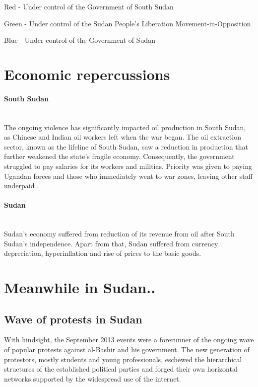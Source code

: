 \documentclass[14pt,a4paper]{article}
\begin{document}
Red - Under control of the Government of South Sudan

Green - Under control of the Sudan People's Liberation Movement-in-Opposition

Blue - Under control of the Government of Sudan

\section{Economic repercussions}
\paragraph{South Sudan} \mbox{}\\
The ongoing violence has significantly impacted oil production in South Sudan, as Chinese and Indian oil workers left when the war began. The oil extraction sector, known as the lifeline of South Sudan, saw a reduction in production that further weakened the state's fragile economy. Consequently, the government struggled to pay salaries for its workers and militias. Priority was given to paying Ugandan forces and those who immediately went to war zones, leaving other staff underpaid \cite{observer2014military}.
\paragraph{Sudan} \mbox{}\\
Sudan's economy suffered from reduction of its revenue from oil after South Sudan's independence. Apart from that, Sudan suffered from currency depreciation, hyperinflation and rise of prices to the basic goods. 



\section{Meanwhile in Sudan..}
\subsection{Wave of protests in Sudan}
With hindsight, the September 2013 events were a forerunner of the ongoing wave of popular protests against al-Bashir and his government. The new generation of protestors, mostly students and young professionals, eschewed the hierarchical structures of the established political parties and forged their own horizontal networks supported by the widespread use of the internet. 
\end{document}

